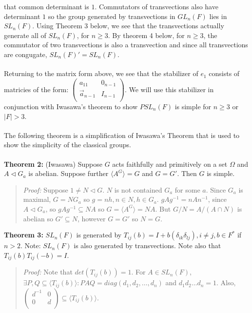 that common determinant is $1$. Commutators of transvections also have determinant $1$ so the group generated by
transvections in $GL_n(F)$ lies in $SL_n(F)$.  Using Theorem 3 below, we see that the transvections actually generate
all of $SL_n(F)$, for $n \geq 3$.  By theorem 4 below, for $n \geq 3$, the commutator of two transvections is also a transvection
and since all transvections are congugate, $SL_n(F)' = SL_n(F)$.
\\
\\
Returning to the matrix form above,
we see that the stabilizer of $e_1$ consists of matricies of the form:
$
\left(
\begin{array}{cc}
a_{11} &  0_{n-1} \\
{\vec a}_{n-1} &  I_{n-1} \\
\end{array}
\right)
$.  We will use this stabilizer in conjunction with Iwasawa's theorem to show $PSL_n(F)$ is simple for $n \geq 3$ or $|F|>3$.
\\
\\
The following theorem is a simplification of Iwasawa's Theorem that is used to show the
simplicity of the classical groups.
\\
\\
{\bf Theorem 2:}
(Iwasawa) Suppose $G$ acts faithfully and primitively on a set $\Omega$ and
$A \lhd G_a$ is abelian. Suppose further $ \langle A^G \rangle = G$ and $G=G'$.
Then $G$ is simple.
\begin{quote}
\emph{Proof:}  
Suppose $1 \ne N \lhd G$.  $N$ is not contained $G_a$ for some $a$.  Since $G_a$ is maximal,
$G=N G_a$ so $g= nh, n \in N, h \in G_a$.  $g A g^{-1} = n A n^{-1}$, since
$A \lhd G_a$, so $g A g^{-1} \subseteq NA$ so $G= \langle A^G \rangle = NA$.  
But $G/N = A/(A \cap N)$ is abelian so
$G' \subseteq N$, however $G=G'$ so $N=G$.
\end{quote}
{\bf Theorem 3:}
$SL_n(F)$ is generated by $T_{ij}(b)=I + b (\delta_{ik} \delta_{lj}), i \ne j, b \in F^*$ if $n>2$.
Note: $SL_n(F)$ is also generated by transvections.  Note also that $T_{ij}(b)T_{ij}(-b) = I$.
\begin{quote}
\emph{Proof:}  
Note that $det(T_{ij}(b))=1$.  For $A \in SL_n(F)$,
$\exists P, Q \subseteq \langle T_{ij}(b) \rangle: PAQ=diag( d_1, d_2 , \ldots, d_n )$ and
$d_1 d_2 \ldots d_n =1$.  Also,
$\left(
\begin{array}{cc}
d^{-1} &  0 \\
0 &  d \\
\end{array}
\right) 
\subseteq \langle T_{ij}(b) \rangle$.
\end{quote}
